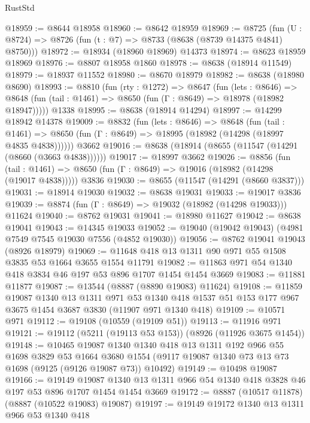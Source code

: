 \begin{lexlean}{RustStd}
\begin{coremodule}
@18959 := @8644 @18958
@18960 := @8642 @18959
@18969 := @8725
    (fun (U : @8724) => @8726 (fun (t : @7) => @8733 (@8638 (@8739 @14375 @4841) @8750)))
@18972 := @18934 (@18960 @18969) @14373
@18974 := @8623 @18959 @18969
@18976 := @8807 @18958 @1860
@18978 := @8638 (@18914 @11549)
@18979 := @18937 @11552
@18980 := @8670 @18979
@18982 := @8638 (@18980 @8690)
@18993 := @8810
    (fun (rty : @1272) =>
    @8647
      (fun (lets : @8646) =>
      @8648 (fun (tail : @1461) => @8650 (fun (Γ : @8649) => @18978 (@18982 @18947)))))
    @1338
@18995 := @8638 (@18914 @14294)
@18997 := @14299 @18942 @14378
@19009 := @8832
    (fun (lets : @8646) =>
    @8648
      (fun (tail : @1461) =>
      @8650 (fun (Γ : @8649) => @18995 (@18982 (@14298 (@18997 @4835 @4838))))))
    @3662
@19016 := @8638 (@18914 (@8655 (@11547 (@14291 (@8660 (@3663 @4838))))))
@19017 := @18997 @3662
@19026 := @8856
    (fun (tail : @1461) => @8650 (fun (Γ : @8649) => @19016 (@18982 (@14298 (@19017 @4838)))))
    @3836
@19030 := @8655 (@11547 (@14291 (@8660 @3837)))
@19031 := @18914 @19030
@19032 := @8638 @19031
@19033 := @19017 @3836
@19039 := @8874 (fun (Γ : @8649) => @19032 (@18982 (@14298 @19033))) @11624
@19040 := @8762 @19031
@19041 := @18980 @11627
@19042 := @8638 @19041
@19043 := @14345 @19033
@19052 := @19040 (@19042 @19043) (@4981 @7549 @7545 @19030 @7556 (@4852 @19030))
@19056 := @8762 @19041 @19043 (@8926 @18979)
@19069 := @11648 @418 @13 @1311 @90 @971 @55 @1508 @3835 @53 @1664 @3655 @1554 @11791
@19082 := @11863 @971 @54 @1340 @418 @3834 @46 @197 @53 @896 @1707 @1454 @1454 @3669
@19083 := @11881 @11877
@19087 := @13544 (@8887 (@8890 @19083) @11624)
@19108 := @11859
    @19087
    @1340
    @13
    @1311
    @971
    @53
    @1340
    @418
    @1537
    @51
    @153
    @177
    @967
    @3675
    @1454
    @3687
    @3830
    (@11907 @971 @1340 @418)
@19109 := @10571 @971
@19112 := @19108 (@10559 (@19109 @51))
@19113 := @11916 @971
@19121 := @19112 (@5211 (@19113 @53 @153)) (@8926 (@11926 @3675 @1454))
@19148 := @10465
    @19087
    @1340
    @1340
    @418
    @13
    @1311
    @192
    @966
    @55
    @1698
    @3829
    @53
    @1664
    @3680
    @1554
    (@9117 @19087 @1340 @73 @13 @73 @1698 (@9125 (@9126 @19087 @73)) @10492)
@19149 := @10498 @19087
@19166 := @19149
    @19087
    @1340
    @13
    @1311
    @966
    @54
    @1340
    @418
    @3828
    @46
    @197
    @53
    @896
    @1707
    @1454
    @1454
    @3669
@19172 := @8887 (@10517 @11878) (@8887 (@10522 @19083) @19087)
@19197 := @19149
    @19172
    @1340
    @13
    @1311
    @966
    @53
    @1340
    @418

\end{coremodule}
\end{lexlean}

